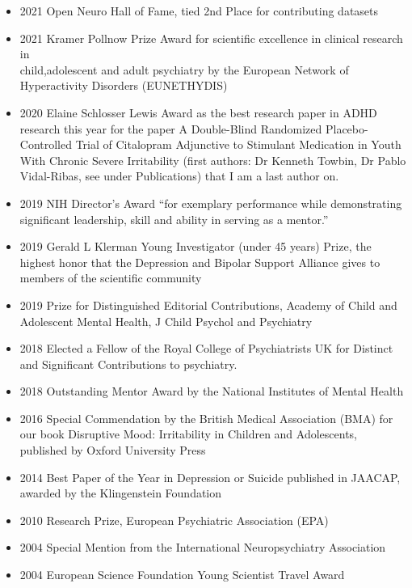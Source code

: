 \documentclass[
]{article}
\providecommand{\tightlist}{%
  \setlength{\itemsep}{0pt}\setlength{\parskip}{0pt}}
\begin{document}
\begin{itemize}
\tightlist
\item
  2021 Open Neuro Hall of Fame, tied 2nd Place for contributing datasets
\item
  2021 Kramer Pollnow Prize Award for scientific excellence in clinical
  research in\\
  child,adolescent and adult psychiatry by the European Network of
  Hyperactivity Disorders (EUNETHYDIS)
\item
  2020 Elaine Schlosser Lewis Award as the best research paper in ADHD
  research this year for the paper A Double-Blind Randomized
  Placebo-Controlled Trial of Citalopram Adjunctive to Stimulant
  Medication in Youth With Chronic Severe Irritability (first authors:
  Dr Kenneth Towbin, Dr Pablo Vidal-Ribas, see under Publications) that
  I am a last author on.
\item
  2019 NIH Director's Award ``for exemplary performance while
  demonstrating significant leadership, skill and ability in serving as
  a mentor.''\\
\item
  2019 Gerald L Klerman Young Investigator (under 45 years) Prize, the
  highest honor that the Depression and Bipolar Support Alliance gives
  to members of the scientific community
\item
  2019 Prize for Distinguished Editorial Contributions, Academy of Child
  and Adolescent Mental Health, J Child Psychol and Psychiatry
\item
  2018 Elected a Fellow of the Royal College of Psychiatrists UK for
  Distinct and Significant Contributions to psychiatry.
\item
  2018 Outstanding Mentor Award by the National Institutes of Mental
  Health
\item
  2016 Special Commendation by the British Medical Association (BMA) for
  our book Disruptive Mood: Irritability in Children and Adolescents,
  published by Oxford University Press
\item
  2014 Best Paper of the Year in Depression or Suicide published in
  JAACAP, awarded by the Klingenstein Foundation
\item
  2010 Research Prize, European Psychiatric Association (EPA)\\
\item
  2004 Special Mention from the International Neuropsychiatry
  Association
\item
  2004 European Science Foundation Young Scientist Travel Award
\end{itemize}
\end{document}
